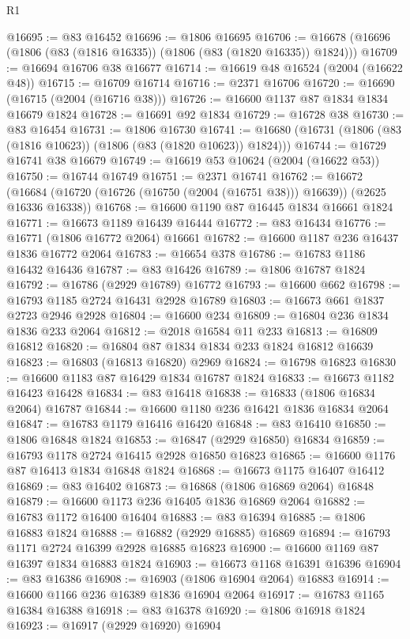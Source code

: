 \begin{lexlean}{R1}
\begin{coremodule}
@16695 := @83 @16452
@16696 := @1806 @16695
@16706 := @16678 (@16696 (@1806 (@83 (@1816 @16335)) (@1806 (@83 (@1820 @16335)) @1824)))
@16709 := @16694 @16706 @38 @16677
@16714 := @16619 @48 @16524 (@2004 (@16622 @48))
@16715 := @16709 @16714
@16716 := @2371 @16706
@16720 := @16690 (@16715 (@2004 (@16716 @38)))
@16726 := @16600 @1137 @87 @1834 @1834 @16679 @1824
@16728 := @16691 @92 @1834
@16729 := @16728 @38
@16730 := @83 @16454
@16731 := @1806 @16730
@16741 := @16680 (@16731 (@1806 (@83 (@1816 @10623)) (@1806 (@83 (@1820 @10623)) @1824)))
@16744 := @16729 @16741 @38 @16679
@16749 := @16619 @53 @10624 (@2004 (@16622 @53))
@16750 := @16744 @16749
@16751 := @2371 @16741
@16762 := @16672
    (@16684 (@16720 (@16726 (@16750 (@2004 (@16751 @38))) @16639)) (@2625 @16336 @16338))
@16768 := @16600 @1190 @87 @16445 @1834 @16661 @1824
@16771 := @16673 @1189 @16439 @16444
@16772 := @83 @16434
@16776 := @16771 (@1806 @16772 @2064) @16661
@16782 := @16600 @1187 @236 @16437 @1836 @16772 @2064
@16783 := @16654 @378
@16786 := @16783 @1186 @16432 @16436
@16787 := @83 @16426
@16789 := @1806 @16787 @1824
@16792 := @16786 (@2929 @16789) @16772
@16793 := @16600 @662
@16798 := @16793 @1185 @2724 @16431 @2928 @16789
@16803 := @16673 @661 @1837 @2723 @2946 @2928
@16804 := @16600 @234
@16809 := @16804 @236 @1834 @1836 @233 @2064
@16812 := @2018 @16584 @11 @233
@16813 := @16809 @16812
@16820 := @16804 @87 @1834 @1834 @233 @1824 @16812 @16639
@16823 := @16803 (@16813 @16820) @2969
@16824 := @16798 @16823
@16830 := @16600 @1183 @87 @16429 @1834 @16787 @1824
@16833 := @16673 @1182 @16423 @16428
@16834 := @83 @16418
@16838 := @16833 (@1806 @16834 @2064) @16787
@16844 := @16600 @1180 @236 @16421 @1836 @16834 @2064
@16847 := @16783 @1179 @16416 @16420
@16848 := @83 @16410
@16850 := @1806 @16848 @1824
@16853 := @16847 (@2929 @16850) @16834
@16859 := @16793 @1178 @2724 @16415 @2928 @16850 @16823
@16865 := @16600 @1176 @87 @16413 @1834 @16848 @1824
@16868 := @16673 @1175 @16407 @16412
@16869 := @83 @16402
@16873 := @16868 (@1806 @16869 @2064) @16848
@16879 := @16600 @1173 @236 @16405 @1836 @16869 @2064
@16882 := @16783 @1172 @16400 @16404
@16883 := @83 @16394
@16885 := @1806 @16883 @1824
@16888 := @16882 (@2929 @16885) @16869
@16894 := @16793 @1171 @2724 @16399 @2928 @16885 @16823
@16900 := @16600 @1169 @87 @16397 @1834 @16883 @1824
@16903 := @16673 @1168 @16391 @16396
@16904 := @83 @16386
@16908 := @16903 (@1806 @16904 @2064) @16883
@16914 := @16600 @1166 @236 @16389 @1836 @16904 @2064
@16917 := @16783 @1165 @16384 @16388
@16918 := @83 @16378
@16920 := @1806 @16918 @1824
@16923 := @16917 (@2929 @16920) @16904

\end{coremodule}
\end{lexlean}
